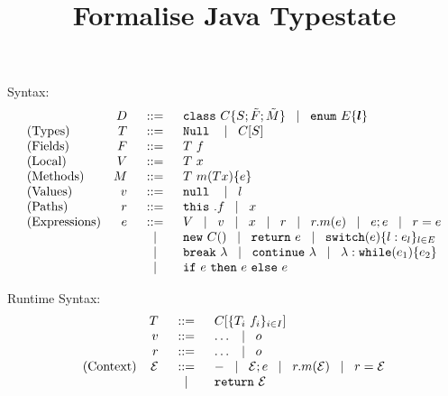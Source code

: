 \documentclass[a4paper]{llncs}
\title{Formalise Java Typestate}
\author{}
\newcommand{\class}{\ensuremath{\mathtt{class}\ }}
\newcommand{\enum}{\ensuremath{\mathtt{enum}\ }}
\newcommand{\Null}{\ensuremath{\mathtt{Null}\ }}
\newcommand{\nul}{\ensuremath{\mathtt{null}\ }}
\newcommand{\this}{\ensuremath{\mathtt{this}\ }}
\newcommand{\brk}{\ensuremath{\mathtt{break}\ }}
\newcommand{\continue}{\ensuremath{\mathtt{continue}\ }}
\newcommand{\return}{\ensuremath{\mathtt{return}\ }}
\newcommand{\ctype}[2]{#1[#2]}
\newcommand{\base}{\ensuremath{\mathtt{base}\ }}
\newcommand{\method}[4]{#1\ #2(#3)\set{#4}}
\newcommand{\vdecl}[2]{#1\ #2}
\newcommand{\mcall}[2]{#1(#2)}
\newcommand{\newo}[1]{\ensuremath{\mathtt{new}\ #1()}}
\newcommand{\switch}[2]{\ensuremath{\mathtt{switch}(#1)\set{#2}}}
\newcommand{\while}[2]{\ensuremath{\mathtt{while}(#1)\set{#2}}}
\begin{document}
	\maketitle

	Syntax:
\[
	\begin{array}{lrcl}
		&D &\bnfis& \class C \set{S; \vect{F}; \vect{M}} \bnfbar \enum E \set{\vec{l}}\\
		\textrm{(Types)} & T &\bnfis& \Null \bnfbar \ctype{C}{S}\\%
		\textrm{(Fields)} &F &\bnfis& \vdecl{T}{f}\\		
		\textrm{(Local)} &V &\bnfis& \vdecl{T}{x}\\
		\textrm{(Methods)} &M &\bnfis& \method{T}{m}{T x}{e}\\
		\textrm{(Values)} &v& \bnfis& \nul \bnfbar l\\
		\textrm{(Paths)}  &r& \bnfis & \this.f \bnfbar x\\
		\textrm{(Expressions)} &e& \bnfis & V \bnfbar v \bnfbar x \bnfbar r \bnfbar r.\mcall{m}{e} \bnfbar e;e \bnfbar r = e\\
		&&\bnfbar & \newo{C} \bnfbar \return e \bnfbar \switch{e}{l : e_l}_{l \in E} \\
		&&\bnfbar & \brk \lambda \bnfbar \continue \lambda \bnfbar \lambda: \while{e_1}{e_2}\\
		&&\bnfbar & \ifthenelse{e}{e}{e}
	\end{array}
\]

	Runtime Syntax:
\[
	\begin{array}{lrcl}
		& T & \bnfis & C[\set{T_i\ f_i}_{i \in I}]\\
		& v & \bnfis & \dots \bnfbar o\\
		& r & \bnfis & \dots \bnfbar o \\
		\textrm{(Context)} & \mathcal{E} &\bnfis& \hole \bnfbar \mathcal{E}; e \bnfbar r.m(\mathcal{E}) \bnfbar r = \mathcal{E}\\
				&&\bnfbar& \return{\mathcal{E}}
	\end{array}
\]

%
%
\end{document}
